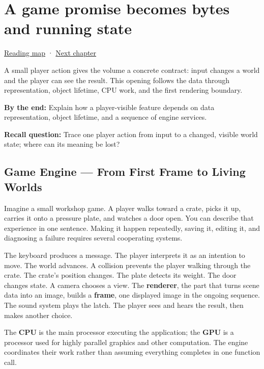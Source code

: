 \chapter{A game promise becomes bytes and running state}\label{05-engine-i-ch001-a-game-promise-becomes-bytes-and-running-state}\hypertarget{05-engine-i-ch001}{}\label{stagechapter:05-engine-i-ch001}

\hyperref[volume-reading-map]{Reading map} · \hyperref[05-engine-i-ch002-how-bytes-become-programs-objects-and-resource-references]{Next chapter}

A small player action gives the volume a concrete contract: input changes a world and the player can see the result. This opening follows the data through representation, object lifetime, CPU work, and the first rendering boundary.

\textbf{By the end:} Explain how a player-visible feature depends on data representation, object lifetime, and a sequence of engine services.

\textbf{Recall question:} Trace one player action from input to a changed, visible world state; where can its meaning be lost?

\section{Game Engine --- From First Frame to Living Worlds}\label{05-engine-i-ch001-game-engine-from-first-frame-to-living-worlds}

Imagine a small workshop game. A player walks toward a crate, picks it up, carries it onto a pressure plate, and watches a door open. You can describe that experience in one sentence. Making it happen repeatedly, saving it, editing it, and diagnosing a failure requires several cooperating systems.

The keyboard produces a message. The player interprets it as an intention to move. The world advances. A collision prevents the player walking through the crate. The crate's position changes. The plate detects its weight. The door changes state. A camera chooses a view. The \textbf{renderer}, the part that turns scene data into an image, builds a \textbf{frame}, one displayed image in the ongoing sequence. The sound system plays the latch. The player sees and hears the result, then makes another choice.

The \textbf{CPU} is the main processor executing the application; the \textbf{GPU} is a processor used for highly parallel graphics and other computation. The engine coordinates their work rather than assuming everything completes in one function call.

